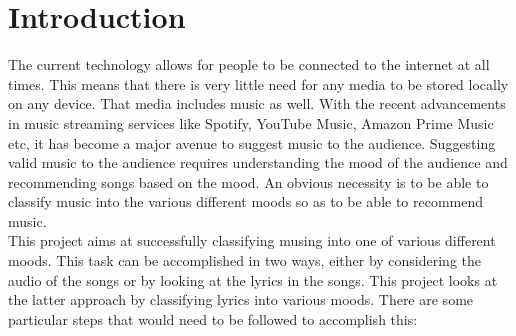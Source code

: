 \documentclass[11pt,a4paper]{article}
\begin{document}
\section{Introduction}
\label{introduction}
The current technology allows for people to be connected to the internet at all times. This means that there is very little need for any media to be stored locally on any device. That media includes music as well. With the recent advancements in music streaming services like Spotify, YouTube Music, Amazon Prime Music etc, it has become a major avenue to suggest music to the audience. Suggesting valid music to the audience requires understanding the mood of the audience and recommending songs based on the mood. An obvious necessity is to be able to classify music into the various different moods so as to be able to recommend music.\\
This project aims at successfully classifying musing into one of various different moods. This task can be accomplished in two ways, either by considering the audio of the songs or by looking at the lyrics in the songs. This project looks at the latter approach by classifying lyrics into various moods. There are some particular steps that would need to be followed to accomplish this:
\end{document}
